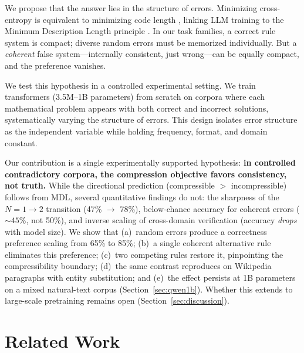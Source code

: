 \documentclass{article}
\begin{document}
We propose that the answer lies in the structure of errors. Minimizing cross-entropy is equivalent to minimizing code length \citep{shannon1948mathematical,deletang2024language}, linking LLM training to the Minimum Description Length principle \citep{rissanen1978modeling,grunwald2007minimum}. In our task families, a correct rule system is compact; diverse random errors must be memorized individually. But a \emph{coherent} false system---internally consistent, just wrong---can be equally compact, and the preference vanishes.

We test this hypothesis in a controlled experimental setting. We train transformers (3.5M--1B parameters) from scratch on corpora where each mathematical problem appears with both correct and incorrect solutions, systematically varying the structure of errors. This design isolates error structure as the independent variable while holding frequency, format, and domain constant.

Our contribution is a single experimentally supported hypothesis: \textbf{in controlled contradictory corpora, the compression objective favors consistency, not truth.} While the directional prediction (compressible $>$ incompressible) follows from MDL, several quantitative findings do not: the sharpness of the $N{=}1 \to 2$ transition (47\% $\to$ 78\%), below-chance accuracy for coherent errors (${\sim}45\%$, not 50\%), and inverse scaling of cross-domain verification (accuracy \emph{drops} with model size). We show that (a)~random errors produce a correctness preference scaling from 65\% to 85\%; (b)~a single coherent alternative rule eliminates this preference; (c)~two competing rules restore it, pinpointing the compressibility boundary; (d)~the same contrast reproduces on Wikipedia paragraphs with entity substitution; and (e)~the effect persists at 1B parameters on a mixed natural-text corpus (Section~\ref{sec:qwen1b}). Whether this extends to large-scale pretraining remains open (Section~\ref{sec:discussion}).

\section{Related Work}
\end{document}
